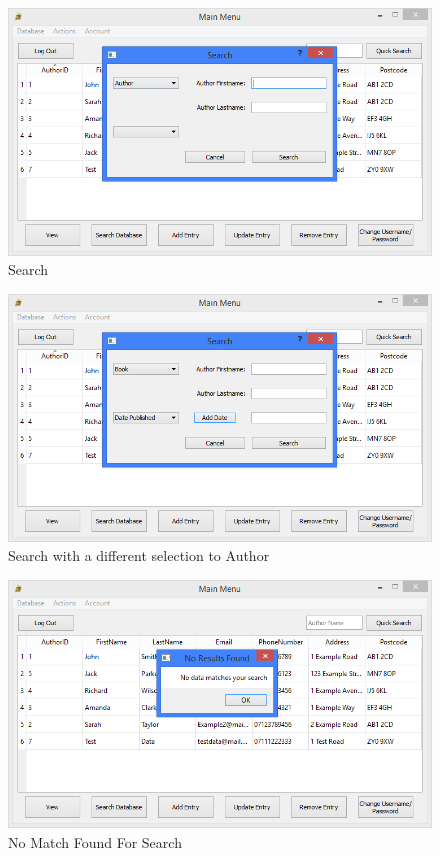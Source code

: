 \begin{figure}[H]
    \caption{Search} \label{fig:Search}
    \includegraphics[width=\textwidth]{./Maintenance/UserInterface/Search.png}
\end{figure}

\begin{figure}[H]
    \caption{Search with a different selection to Author} \label{fig:SearchSelectionChosen}
    \includegraphics[width=\textwidth]{./Maintenance/UserInterface/SearchSelectionChosen.png}
\end{figure}

\begin{figure}[H]
    \caption{No Match Found For Search} \label{fig:NoMatchSearch}
    \includegraphics[width=\textwidth]{./Maintenance/UserInterface/NoMatchSearch.png}
\end{figure}

